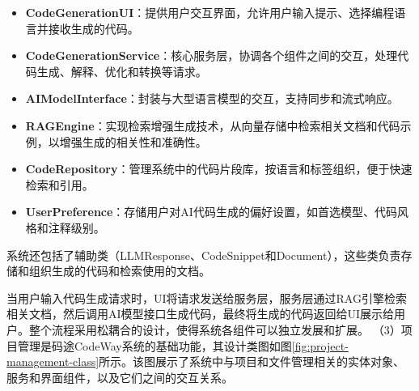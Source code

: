 \documentclass[
    report,     %
    oneside,    %
    UTF8,       %
    zihao=-4    %
]{config} %
\begin{document}
\begin{itemize}
    \item \textbf{CodeGenerationUI}：提供用户交互界面，允许用户输入提示、选择编程语言并接收生成的代码。
    \item \textbf{CodeGenerationService}：核心服务层，协调各个组件之间的交互，处理代码生成、解释、优化和转换等请求。
    \item \textbf{AIModelInterface}：封装与大型语言模型的交互，支持同步和流式响应。
    \item \textbf{RAGEngine}：实现检索增强生成技术，从向量存储中检索相关文档和代码示例，以增强生成的相关性和准确性。
    \item \textbf{CodeRepository}：管理系统中的代码片段库，按语言和标签组织，便于快速检索和引用。
    \item \textbf{UserPreference}：存储用户对AI代码生成的偏好设置，如首选模型、代码风格和注释级别。
\end{itemize}

系统还包括了辅助类（LLMResponse、CodeSnippet和Document），这些类负责存储和组织生成的代码和检索使用的文档。

当用户输入代码生成请求时，UI将请求发送给服务层，服务层通过RAG引擎检索相关文档，然后调用AI模型接口生成代码，最终将生成的代码返回给UI展示给用户。整个流程采用松耦合的设计，使得系统各组件可以独立发展和扩展。
（3）项目管理是码途CodeWay系统的基础功能，其设计类图如图\ref{fig:project-management-class}所示。该图展示了系统中与项目和文件管理相关的实体对象、服务和界面组件，以及它们之间的交互关系。
\end{document}
